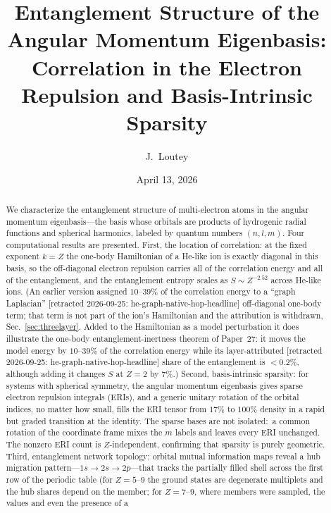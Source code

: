\documentclass[twocolumn,pra,amsmath,amssymb,superscriptaddress]{revtex4-2}
\begin{document}
\title{Entanglement Structure of the Angular Momentum Eigenbasis:\\
Correlation in the Electron Repulsion and Basis-Intrinsic Sparsity}

\author{J.~Loutey}

\date{April 13, 2026}

\begin{abstract}
We characterize the entanglement structure of multi-electron atoms
in the angular momentum eigenbasis---the basis whose orbitals are
products of hydrogenic radial functions and spherical harmonics,
labeled by quantum numbers $(n, l, m)$.  Four computational results
are presented.
First, the location of correlation: at the fixed exponent $k=Z$ the
one-body Hamiltonian of a He-like ion is exactly diagonal in this basis,
so the off-diagonal electron repulsion carries all of the correlation
energy and all of the entanglement, and the entanglement entropy scales
as $S \sim Z^{-2.52}$ across He-like ions.  (An earlier version assigned
$10$--$39\%$ of the correlation energy to a ``graph Laplacian'' [retracted 2026-09-25: he-graph-native-hop-headline]
off-diagonal one-body term; that term is not part of the ion's
Hamiltonian and the attribution is withdrawn, Sec.~\ref{sec:threelayer}.
Added to the Hamiltonian as a model perturbation it does illustrate the
one-body entanglement-inertness theorem of Paper~27: it moves the model
energy by $10$--$39\%$ of the correlation energy while its layer-attributed [retracted 2026-09-25: he-graph-native-hop-headline]
share of the entanglement is $<0.2\%$, although adding it changes $S$ at
$Z=2$ by $7\%$.)
Second, basis-intrinsic sparsity: for systems with spherical symmetry,
the angular momentum eigenbasis gives sparse electron repulsion integrals
(ERIs), and a generic unitary rotation of the orbital indices, no
matter how small, fills the ERI tensor from $17\%$ to $100\%$ density
in a rapid but graded transition at the identity.  The sparse bases
are not isolated:\ a common rotation of the coordinate frame mixes the
$m$ labels and leaves every ERI unchanged.  The nonzero ERI count
is $Z$-independent, confirming that sparsity is purely geometric.
Third, entanglement network topology: orbital mutual information
maps reveal a hub migration pattern---$1s \to 2s \to 2p$---that
tracks the partially filled shell across the first row of the
periodic table (for $Z = 5$--$9$ the ground states are degenerate
multiplets and the hub shares depend on the member; for $Z = 7$--$9$,
where members were sampled, the values and even the presence of a

\end{abstract}
\end{document}
